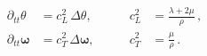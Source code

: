 \[
\begin{aligned}
    \partial_{tt}\theta &= c_L^2\,\Delta\theta, & \qquad c_L^2 &= \frac{\lambda+2\mu}{\rho}\, ,\\
    \partial_{tt}\boldsymbol{\omega} &= c_T^2\,\Delta\boldsymbol{\omega}, & \qquad c_T^2 &= \frac{\mu}{\rho}\, .
\end{aligned}
\]

\begin{comment}
In isotropen, homogenen Festkörpern beschreibt die lineare Elastizität (Hooke) die Beziehung zwischen Spannung $\sigma$ und Dehnung $\varepsilon$
Mit den Lamé-Konstanten $(\lambda,\mu)$, wobei $\mu=G$ das Schubmodul ist und $\mathbf{u}$ das Verschibungsfeld im Festkörper beschreibt, lautet im 3D-Fall:
\begin{equation}
    \sigma = \lambda\,(\nabla\!\cdot\! \mathbf{u})\,\mathbf{I} + 2\mu\,\varepsilon,
    \qquad \varepsilon=\tfrac{1}{2}\left(\nabla\mathbf{u}+(\nabla\mathbf{u})^{\!\top}\right).
\end{equation}
wobei $\mathbf{I}$ die Einheitsmatrix ist und $\nabla\mathbf{u}$ die Volumendehnung beschreibt.

\paragraph{Hooke (isotrop, linear)}
Mit Lamé-Konstanten $\lambda,\mu$ gilt
\begin{equation}
  \sigma_{ij} = \lambda\,\varepsilon_{kk}\,\delta_{ij} + 2\mu\,\varepsilon_{ij},
  \qquad
  \varepsilon_{ij} = \tfrac12(\partial_i u_j + \partial_j u_i).
  \label{eq:hooke-index}
\end{equation}

\paragraph{Impulsbilanz (ohne Körperkräfte)}
\begin{equation}
  \rho\,\partial_{tt} u_i = \partial_j \sigma_{ij}.
  \label{eq:momentum-index}
\end{equation}


\end{comment}

